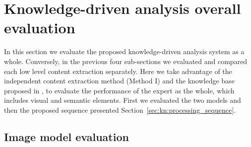 





\section{Knowledge-driven analysis overall evaluation} %
\label{sub:ex:knowledge_driven_analysis_evaluation}

In this section we evaluate the proposed knowledge-driven analysis system as a whole.
Conversely, in the previous four sub-sections we evaluated and compared each low level content extraction separately.
Here we take advantage of the independent content extraction method (Method I) and the knowledge base proposed in , to evaluate the performance of the expert as the whole, which includes visual and semantic elements.
First we evaluated the two models and then the proposed sequence presented Section~\ref{sec:kn:processing_sequence}.

\subsection{Image model evaluation} %
\label{sub:image_model_evaluation}

